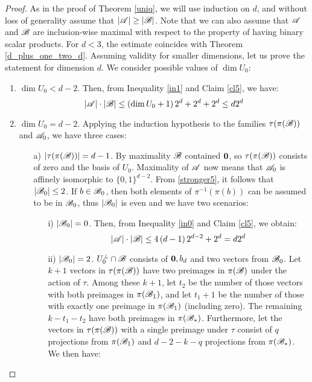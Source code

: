 \mainth*
\begin{proof}
    As in the proof of Theorem \ref{uniq}, we will use induction on $d$, and without loss of generality assume that $\left|{\mathscr{A}}\right|\geq\left|{\mathscr{B}}\right|$. Note that we can also assume that ${\mathscr{A}}$ and ${\mathscr{B}}$ are inclusion-wise maximal with respect to the property of having binary scalar products. For $d<3$, the estimate coincides with Theorem \ref{d_plus_one_two_d}. Assuming validity for smaller dimensions, let us prove the statement for dimension $d$. We consider possible values of $\operatorname{dim}U_0$:

    \begin{enumerate}
        \item $\operatorname{dim}U_0 < d-2$. Then, from Inequality \ref{in1} and Claim \ref{cl5}, we have:
        \begin{equation}\label{strongWhenLessd-2}
            \left|{\mathscr{A}}\right|\cdot\left|{\mathscr{B}}\right| \leq \left(\operatorname{dim} U_0 + 1\right) 2^d + 2^d + 2^d\leq d 2^d
        \end{equation}
        \item $\operatorname{dim}U_0 = d-2$. Applying the induction hypothesis to the families $\tau(\pi({\mathscr{B}}))$ and ${\mathscr{A}}_0$, we have three cases:
        \begin{enumerate}
            \item[a)] $|\tau(\pi({\mathscr{B}}))|=d-1$. By maximality ${\mathscr{B}}$ contained $\mathbf{0}$, so $\tau(\pi({\mathscr{B}}))$ consists of zero and the basis of $U_0$. Maximality of ${\mathscr{A}}$ now means that ${\mathscr{A}}_0$ is affinely isomorphic to $\{0,1\}^{d-2}$. From \eqref{stronger5}, it follows that $\left|{\mathscr{B}}_0\right|\leq2$. If $b\in{\mathscr{B}}_0$, then both elements of $\pi^{-1}(\pi(b))$ can be assumed to be in ${\mathscr{B}}_0$, thus $\left|{\mathscr{B}}_0\right|$ is even and we have two scenarios:
            \begin{enumerate}
                \item[i)] $\left|{\mathscr{B}}_0\right|=0$. Then, from Inequality \ref{in0} and Claim \ref{cl5}, we obtain:
                \begin{equation*}
                    \left|{\mathscr{A}}\right|\cdot\left|{\mathscr{B}}\right|\leq4\left(d-1\right)2^{d-2}+2^d=d 2^d
                \end{equation*}
                \item[ii)] $\left|{\mathscr{B}}_0\right|=2$. $U_0^{\bot} \cap {\mathscr{B}}$ consists of $\mathbf{0}, b_d$ and two vectors from ${\mathscr{B}}_0$. Let $k+1$ vectors in $\tau(\pi({\mathscr{B}}))$ have two preimages in $\pi({\mathscr{B}})$ under the action of $\tau$. Among these $k+1$, let $t_2$ be the number of those vectors with both preimages in $\pi({\mathscr{B}}_1)$, and let $t_1+1$ be the number of those with exactly one preimage in $\pi({\mathscr{B}}_1)$ (including zero). The remaining $k-t_1-t_2$ have both preimages in $\pi({\mathscr{B}}_*)$. Furthermore, let the vectors in $\tau(\pi({\mathscr{B}}))$ with a single preimage under $\tau$ consist of $q$ projections from $\pi({\mathscr{B}}_1)$ and $d-2-k-q$ projections from $\pi({\mathscr{B}}_*)$. We then have:

\end{enumerate}
\end{enumerate}
\end{enumerate}
\end{proof}
